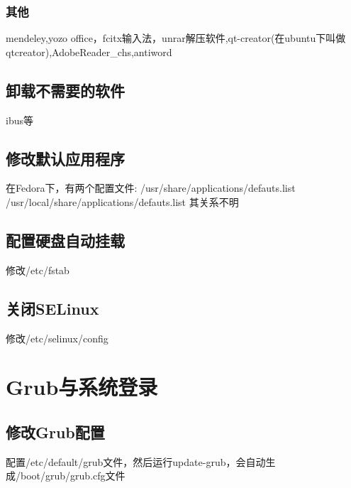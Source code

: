 \subsubsection{其他}
mendeley,yozo office，fcitx输入法，unrar解压软件,qt-creator(在ubuntu下叫做qtcreator),AdobeReader\_chs,antiword

\subsection{卸载不需要的软件}
ibus等

\subsection{修改默认应用程序}
在Fedora下，有两个配置文件:
/usr/share/applications/defauts.list \\
/usr/local/share/applications/defauts.list
其关系不明

\subsection{配置硬盘自动挂载}
修改/etc/fstab

\subsection{关闭SELinux}
修改/etc/selinux/config



\newpage




\section{Grub与系统登录}
\subsection{修改Grub配置}
配置/etc/default/grub文件，然后运行update-grub，会自动生成/boot/grub/grub.cfg文件
